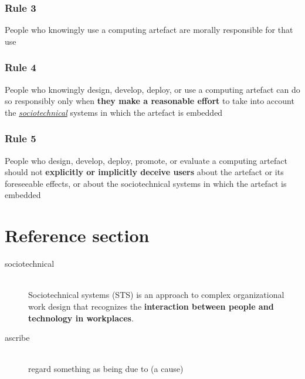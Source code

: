 \documentclass{article}
\newcommand{\worddef}[1]{\hyperref[sec:reference]{\textit{#1}}}
\begin{document}
\subsubsection{Rule 3}
\begin{flushleft}
People who knowingly use a computing artefact are morally responsible for that use
\end{flushleft}

\subsubsection{Rule 4}
\begin{flushleft}
People who knowingly design, develop, deploy, or use a computing artefact can do so responsibly only when \textbf{they make a reasonable effort} to take into account the \worddef{sociotechnical} systems in which the artefact is embedded
\end{flushleft}

\subsubsection{Rule 5}
\begin{flushleft}
People who design, develop, deploy, promote, or evaluate a computing artefact should not \textbf{explicitly or implicitly deceive users} about the artefact or its foreseeable effects, or about the sociotechnical systems in which the artefact is embedded
\end{flushleft}

\pagebreak
\section*{Reference section} \label{sec:reference}
\begin{description}
	\item[sociotechnical] \hfill \\ Sociotechnical systems (STS) is an approach to complex organizational work design that recognizes the \textbf{interaction between people and technology in workplaces}. 
	\item[ascribe] \hfill \\ regard something as being due to (a cause)
\end{description}
\end{document}

